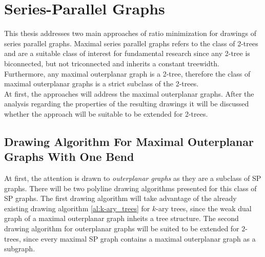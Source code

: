 \section{Series-Parallel Graphs}\label{section:SP-graphs}

This thesis addresses two main approaches of ratio minimization for drawings of series parallel graphs. Maximal series parallel graphs refers to the class of 2-trees %
and are a suitable class of interest for fundamental research since any 2-tree is biconnected, but not triconnected and inherits a constant treewidth. Furthermore, any maximal outerplanar graph is a 2-tree, therefore the class of maximal outerplanar graphs is a strict subclass of the 2-trees.\\
At first, the approaches will address the maximal outerplanar graphs. After the analysis regarding the properties of the resulting drawings it will be discussed whether the approach will be suitable to be extended for 2-trees. 

\subsection{Drawing Algorithm For Maximal Outerplanar Graphs With One Bend}

At first, the attention is drawn to \emph{outerplanar graphs} as they are a subclass of SP graphs. There will be two polyline drawing algorithms presented for this class of SP graphs. The first drawing algorithm will take advantage of the already existing drawing algorithm \ref{al:k-ary_trees} for $k$-ary trees, since the weak dual graph of a maximal outerplanar graph inheits a tree structure. The second drawing algorithm for outerplanar graphs will be suited to be extended for $2$-trees, since every maximal SP graph contains a maximal outerplanar graph as a subgraph.

